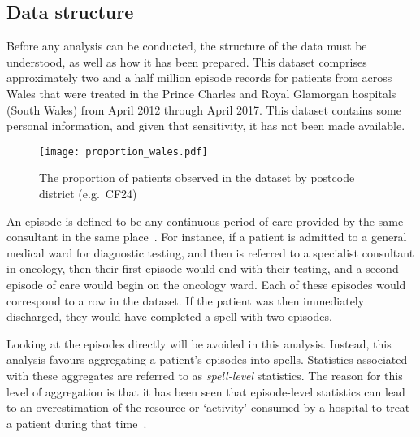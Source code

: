 \subsection{Data structure}\label{subsec:structure}

Before any analysis can be conducted, the structure of the data must be
understood, as well as how it has been prepared. This dataset comprises
approximately two and a half million episode records for patients from across
Wales that were treated in the Prince Charles and Royal Glamorgan hospitals
(South Wales) from April 2012 through April 2017. This dataset contains some
personal information, and given that sensitivity, it has not been made
available.

\begin{figure}
    \centering
    \texttt{[image: proportion\_wales.pdf]}
    \caption{%
        The proportion of patients observed in the dataset by postcode district
        (e.g.\ CF24)%
    }\label{fig:proportion_wales}
\end{figure}

An episode is defined to be any continuous period of care provided by the same
consultant in the same place~\cite{NHS:episode}. For instance, if a patient is
admitted to a general medical ward for diagnostic testing, and then is referred
to a specialist consultant in oncology, then their first episode would end with
their testing, and a second episode of care would begin on the oncology ward.
Each of these episodes would correspond to a row in the dataset. If the patient
was then immediately discharged, they would have completed a spell with two
episodes.

Looking at the episodes directly will be avoided in this analysis. Instead, this
analysis favours aggregating a patient's episodes into spells. Statistics
associated with these aggregates are referred to as \emph{spell-level}
statistics. The reason for this level of aggregation is that it has been seen
that episode-level statistics can lead to an overestimation of the
resource or `activity' consumed by a hospital to treat a patient during that
time~\cite{Aylin2004}.

